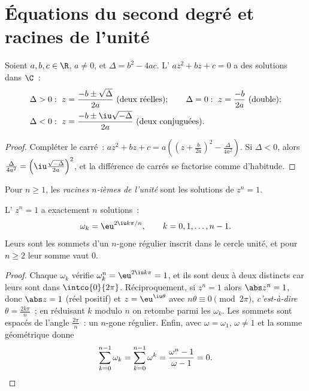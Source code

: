 \section{Équations du second degré et racines de l'unité}

\begin{theorem}\label{thm:g12:complex:quadratic}
Soient $a, b, c \in \R$, $a \neq 0$, et $\Delta = b^2 - 4ac$. L'
$az^2 + bz + c = 0$ a des solutions dans $\C$~:
\[
\begin{aligned}
&\Delta > 0:\ z = \frac{-b \pm \sqrt{\Delta}}{2a} \ (\text{deux réelles}); \qquad
\Delta = 0:\ z = \frac{-b}{2a} \ (\text{double}); \\
&\Delta < 0:\ z = \frac{-b \pm \iu\sqrt{-\Delta}}{2a} \ (\text{deux conjuguées}).
\end{aligned}
\]
\end{theorem}

\begin{proof}
Compléter le carré~:
$az^2 + bz + c = a\left(\left(z + \frac{b}{2a}\right)^2 -
\frac{\Delta}{4a^2}\right)$. Si $\Delta < 0$, alors
$\frac{\Delta}{4a^2} = \left(\iu\frac{\sqrt{-\Delta}}{2a}\right)^2$, et la
différence de carrés se factorise comme d'habitude.
\end{proof}

\begin{definition}\label{def:g12:complex:rootsofunity}
Pour $n \geq 1$, les \emph{racines $n$-ièmes de l'unité}
sont les solutions de $z^n = 1$.
\end{definition}

\begin{theorem}\label{thm:g12:complex:rootsofunity}
L' $z^n = 1$ a exactement $n$ solutions~:
\[
\omega_k = \eu^{2\iu k\pi/n}, \qquad k = 0, 1, \dots, n-1 .
\]
Leurs  sont les sommets d'un $n$-gone régulier inscrit dans le cercle
unité, et pour $n \geq 2$ leur somme vaut $0$.
\end{theorem}

\begin{proof}
Chaque $\omega_k$ vérifie $\omega_k^n = \eu^{2\iu k\pi} = 1$, et ils sont
deux à deux distincts car leurs  sont dans $\intco{0}{2\pi}$.
Réciproquement, si $z^n = 1$ alors $\abs z^n = 1$, donc $\abs z = 1$ (réel
positif) et $z = \eu^{\iu\theta}$ avec $n\theta \equiv 0 \pmod{2\pi}$,
\emph{c'est-à-dire} $\theta = \frac{2k\pi}{n}$~; en réduisant $k$ modulo $n$
on retombe parmi les $\omega_k$. Les sommets sont espacés de l'angle
$\frac{2\pi}{n}$~: un $n$-gone régulier. Enfin, avec $\omega = \omega_1$,
$\omega \neq 1$ et la somme géométrique donne
\[
\sum_{k=0}^{n-1}\omega_k = \sum_{k=0}^{n-1}\omega^k
= \frac{\omega^n - 1}{\omega - 1} = 0 . \qedhere
\]
\end{proof}


